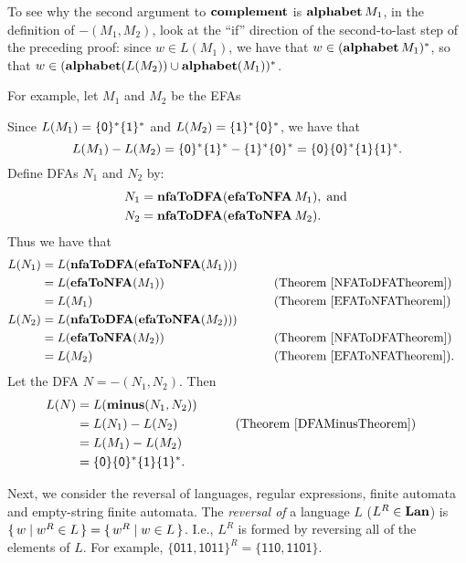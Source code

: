 To see why the second argument to $\mathbf{complement}$ is
$\mathbf{alphabet}\,M_1$, in the definition of $\minus(M_1,M_2)$, look at
the ``if'' direction of the second-to-last step of the preceding
proof: since $w\in L(M_1)$, we have that $w\in(\mathbf{alphabet}\,M_1)^*$, so
that $w\in (\mathbf{alphabet}(L(M_2))\cup\mathbf{alphabet}(M_1))^*$.

For example, let $M_1$ and $M_2$ be the EFAs
\begin{center}

\end{center}
Since $L(M_1)=\{\mathsf{0}\}^*\{\mathsf{1}\}^*$ and
$L(M_2)=\{\mathsf{1}\}^*\{\mathsf{0}\}^*$, we have that
\begin{displaymath}
L(M_1)-L(M_2)=\{\mathsf{0}\}^*\{\mathsf{1}\}^*-\{\mathsf{1}\}^*\{\mathsf{0}\}^* =
\{\mathsf{0}\}\{\mathsf{0}\}^*\{\mathsf{1}\}\{\mathsf{1}\}^* .
\end{displaymath}
Define DFAs $N_1$ and $N_2$ by:
\begin{align*}
N_1 &= \mathbf{nfaToDFA}(\mathbf{efaToNFA}\,M_1) , \;\allowbreak\mbox{and}\allowbreak\; \\
N_2 &= \mathbf{nfaToDFA}(\mathbf{efaToNFA}\,M_2) .
\end{align*}
Thus we have that
\begin{alignat*}{2}
L(N_1) &= L(\mathbf{nfaToDFA}(\mathbf{efaToNFA}(M_1))) \\
       &= L(\mathbf{efaToNFA}(M_1)) && \qquad{\textrm{(Theorem~\ref{NFAToDFATheorem})}} \\
       &= L(M_1) && \qquad{\textrm{(Theorem~\ref{EFAToNFATheorem})}} \\
L(N_2) &= L(\mathbf{nfaToDFA}(\mathbf{efaToNFA}(M_2))) \\
       &= L(\mathbf{efaToNFA}(M_2)) && \qquad{\textrm{(Theorem~\ref{NFAToDFATheorem})}} \\
       &= L(M_2) && \qquad{\textrm{(Theorem~\ref{EFAToNFATheorem})}} .
\end{alignat*}
Let the DFA $N=\minus(N_1,N_2)$.
Then
\begin{alignat*}{2}
L(N) &= L(\mathbf{minus}(N_1,N_2)) \\
     &= L(N_1)-L(N_2) && \qquad{\textrm{(Theorem~\ref{DFAMinusTheorem})}} \\
     &= L(M_1)-L(M_2) \\
     &= \{\mathsf{0}\}\{\mathsf{0}\}^*\{\mathsf{1}\}\{\mathsf{1}\}^* .
\end{alignat*}

Next, we consider the reversal of languages, regular expressions,
finite automata and empty-string finite automata.
The \emph{reversal of}
%
%
a language $L$ ($L^R\in\mathbf{Lan}$)
%
%
is $\{ \, w \mid w^R\in L \, \} = \{ \, w^R \mid w\in L \, \}$.  I.e., $L^R$ is formed
by reversing all of the elements of $L$.  For example, $\{\mathsf{011,
1011}\}^R = \{\mathsf{110, 1101}\}$.

